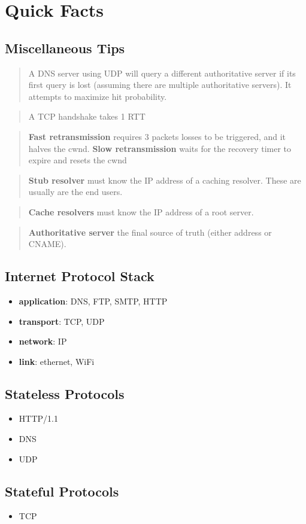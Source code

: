 \section{Quick Facts}
\subsection*{Miscellaneous Tips}
\footnotesize
\blockquote{A DNS server using UDP will query a different authoritative
server if its first query is lost (assuming there are multiple
authoritative servers). It attempts to maximize hit probability.}

\blockquote{A TCP handshake takes 1 RTT}

\blockquote{\textbf{Fast retransmission} requires 3 packets losses to be
triggered, and it halves the cwnd. \textbf{Slow retransmission} waits
for the recovery timer to expire and resets the cwnd}

\blockquote{\textbf{Stub resolver} must know the IP address of a caching
resolver. These are usually are the end users.}

\blockquote{\textbf{Cache resolvers} must know the IP address of a root
server.}

\blockquote{\textbf{Authoritative server} the final source of truth
(either address or CNAME).}

\small
\subsection*{Internet Protocol Stack}
\begin{itemize}
  \item \textbf{application}: DNS, FTP, SMTP, HTTP
  \item \textbf{transport}: TCP, UDP
  \item \textbf{network}: IP
  \item \textbf{link}: ethernet, WiFi
\end{itemize}
\subsection*{Stateless Protocols}
\begin{itemize}
  \item HTTP/1.1
  \item DNS
  \item UDP
\end{itemize}
\subsection*{Stateful Protocols}
\begin{itemize}
  \item TCP
\end{itemize}
